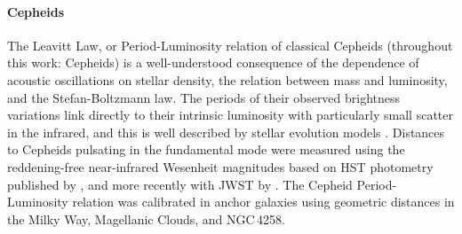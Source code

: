 

\paragraph{\textbf{Cepheids}}
The Leavitt Law, or Period-Luminosity relation of classical Cepheids (throughout this work: Cepheids) is a well-understood consequence of the dependence of acoustic oscillations on stellar density, the relation between mass and luminosity, and the Stefan-Boltzmann law. The periods of their observed brightness variations link directly to their intrinsic luminosity  \citep{1912HarCi.173....1L} with particularly small scatter in the infrared, and this is well described by stellar evolution models \citep[e.g.,][]{2025arXiv250522512K}. Distances to Cepheids pulsating in the fundamental mode were measured using the reddening-free near-infrared Wesenheit magnitudes based on HST photometry published by \citet{2018ApJ...855..136R, 2021ApJ...908L...6R, 2022ApJ...938...36R, 2019ApJ...876...85R, 2022ApJ...934L...7R, 2022ApJ...940...64Y, 2024ApJ...973...30B}, and more recently with JWST by \citet{2023ApJ...956L..18R, 2024ApJ...977..120R, 2025arXiv250901667R}. The Cepheid Period-Luminosity relation was calibrated in anchor galaxies using geometric distances in the Milky Way, Magellanic Clouds, and NGC$\,$4258.

